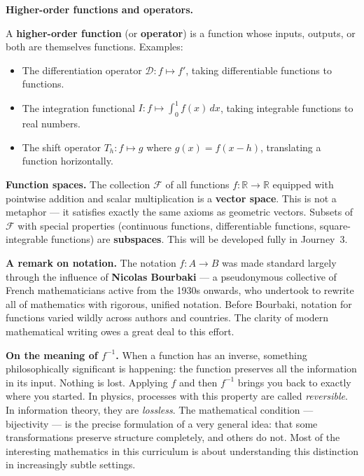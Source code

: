 \documentclass[12pt, a4paper]{article}
\begin{document}
\begin{namebox}
\textbf{Higher-order functions and operators.}

A \textbf{higher-order function} (or \textbf{operator}) is a function whose inputs, outputs, or both are themselves functions. Examples:
\begin{itemize}[topsep=4pt]
  \item The differentiation operator $\mathcal{D} : f \mapsto f'$, taking differentiable functions to functions.
  \item The integration functional $I : f \mapsto \displaystyle\int_0^1 f(x)\,dx$, taking integrable functions to real numbers.
  \item The shift operator $T_h : f \mapsto g$ where $g(x) = f(x - h)$, translating a function horizontally.
\end{itemize}

\medskip
\textbf{Function spaces.} The collection $\mathcal{F}$ of all functions $f : \mathbb{R} \to \mathbb{R}$ equipped with pointwise addition and scalar multiplication is a \textbf{vector space}. This is not a metaphor --- it satisfies exactly the same axioms as geometric vectors. Subsets of $\mathcal{F}$ with special properties (continuous functions, differentiable functions, square-integrable functions) are \textbf{subspaces}. This will be developed fully in Journey~3.
\end{namebox}

\medskip
\noindent\textbf{A remark on notation.}
The notation $f : A \to B$ was made standard largely through the influence of \textbf{Nicolas Bourbaki} --- a pseudonymous collective of French mathematicians active from the 1930s onwards, who undertook to rewrite all of mathematics with rigorous, unified notation. Before Bourbaki, notation for functions varied wildly across authors and countries. The clarity of modern mathematical writing owes a great deal to this effort.

\begin{thought}
\textbf{On the meaning of $f^{-1}$.}
When a function has an inverse, something philosophically significant is happening: the function preserves all the information in its input. Nothing is lost. Applying $f$ and then $f^{-1}$ brings you back to exactly where you started. In physics, processes with this property are called \emph{reversible}. In information theory, they are \emph{lossless}. The mathematical condition --- bijectivity --- is the precise formulation of a very general idea: that some transformations preserve structure completely, and others do not. Most of the interesting mathematics in this curriculum is about understanding this distinction in increasingly subtle settings.
\end{thought}
\end{document}
